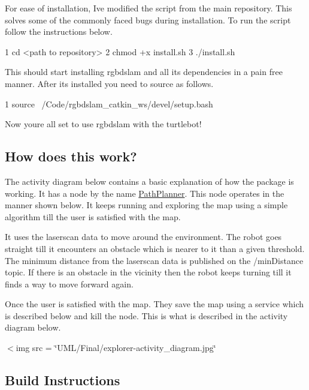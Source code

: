 For ease of installation, I\textquotesingle{}ve modified the script from the main repository. This solves some of the commonly faced bugs during installation. To run the script follow the instructions below.


\begin{DoxyCode}
1 cd <path to repository>
2 chmod +x install.sh
3 ./install.sh
\end{DoxyCode}


This should start installing rgbdslam and all its dependencies in a pain free manner. After it\textquotesingle{}s installed you need to source as follows.


\begin{DoxyCode}
1 source ~/Code/rgbdslam\_catkin\_ws/devel/setup.bash
\end{DoxyCode}


Now you\textquotesingle{}re all set to use rgbdslam with the turtlebot!

\subsection*{How does this work?}

The activity diagram below contains a basic explanation of how the package is working. It has a node by the name {\ttfamily \hyperlink{class_path_planner}{Path\+Planner}}. This node operates in the manner shown below. It keeps running and exploring the map using a simple algorithm till the user is satisfied with the map.

It uses the laserscan data to move around the environment. The robot goes straight till it encounters an obstacle which is nearer to it than a given threshold. The minimum distance from the laserscan data is published on the /min\+Distance topic. If there is an obstacle in the vicinity then the robot keeps turning till it finds a way to move forward again.

Once the user is satisfied with the map. They save the map using a service which is described below and kill the node. This is what is described in the activity diagram below.

$<$img src = \char`\"{}\+U\+M\+L/\+Final/explorer-\/activity\+\_\+diagram.\+jpg\char`\"{} \begin{quote}


\end{quote}


\subsection*{Build Instructions}

